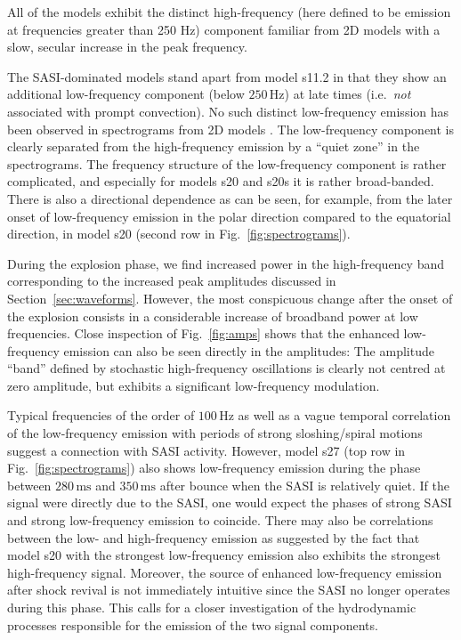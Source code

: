 All of the models exhibit the distinct high-frequency (here defined to be emission at
frequencies greater than 250 Hz) component familiar from 2D models with a slow, secular increase in the peak frequency.

The SASI-dominated models stand apart from model s11.2 in that they show an additional low-frequency component
(below $250 \, \mathrm{Hz}$) at late times (i.e.\ \emph{not} associated with prompt
convection). No such distinct low-frequency emission has been observed in
spectrograms from 2D models \citep{murphy_09,mueller_13}. The
low-frequency component is clearly separated from the high-frequency
emission by a ``quiet zone'' in the spectrograms. The frequency
structure of the low-frequency component is rather complicated, and
especially for models s20 and s20s it is rather
broad-banded. There is also a directional dependence as can be seen, for example,
from the later onset of low-frequency emission in the polar direction compared to the equatorial direction, 
in model s20 (second row in Fig.~\ref{fig:spectrograms}).

During the explosion phase, we find increased power in the high-frequency band corresponding to the increased peak amplitudes discussed
in Section~\ref{sec:waveforms}. However, the most conspicuous change after the onset
of the explosion consists in a considerable increase
of broadband power at low frequencies.
Close inspection of Fig.~\ref{fig:amps} shows that
the enhanced low-frequency emission can also be seen
directly in the amplitudes: The amplitude
``band'' defined by stochastic high-frequency oscillations
is clearly not centred at zero amplitude, but
exhibits a significant low-frequency modulation.

Typical frequencies of the order of $100 \, \mathrm{Hz}$ as well as a
vague temporal correlation of the low-frequency emission with periods
of strong sloshing/spiral motions suggest a connection with
SASI activity. However, model s27 (top row in
Fig.~\ref{fig:spectrograms}) also shows low-frequency emission during
the phase between $280 \, \mathrm{ms}$ and $350 \, \mathrm{ms}$ after
bounce when the SASI is relatively quiet. If the signal were
directly due to the SASI, one would expect the phases of strong SASI
and strong low-frequency emission to coincide. There may also be
correlations between the low- and high-frequency emission as suggested
by the fact that model s20 with the strongest
low-frequency emission also exhibits the strongest high-frequency
signal. Moreover, the source of enhanced low-frequency emission after
shock revival is not immediately intuitive since the SASI no longer
operates during this phase.  This calls for a closer investigation of
the hydrodynamic processes responsible for the emission of the two
signal components.

